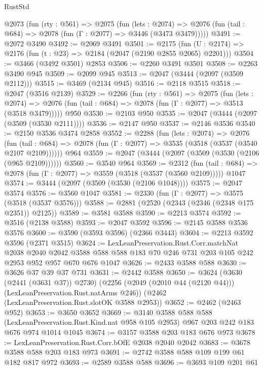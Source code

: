\begin{lexlean}{RustStd}
\begin{coremodule}
  @2073
    (fun (rty : @561) =>
    @2075
      (fun (lets : @2074) =>
      @2076 (fun (tail : @684) => @2078 (fun (Γ : @2077) => @3446 (@3473 @3479)))))
@3491 := @2072 @3490
@3492 := @2069 @3491
@3501 := @2175 (fun (U : @2174) => @2176 (fun (t : @23) => @2184 (@2047 (@2190 @2855 @2065) @2201)))
@3504 := @3466 (@3492 @3501) @2853
@3506 := @2260 @3491 @3501
@3508 := @2263 @3490 @945
@3509 := @2099 @945
@3513 := @2047 (@3444 (@2097 (@3509 @2112)))
@3515 := @3469 (@2134 @945)
@3516 := @2118 @3515
@3518 := @2047 (@3516 @2139)
@3529 := @2266
    (fun (rty : @561) =>
    @2075
      (fun (lets : @2074) =>
      @2076 (fun (tail : @684) => @2078 (fun (Γ : @2077) => @3513 (@3518 @3479)))))
    @950
@3530 := @2103 @950
@3535 := @2047 (@3444 (@2097 (@3509 (@3530 @2111))))
@3536 := @2147 @950
@3537 := @2146 @3536
@3540 := @2150 @3536 @3474 @2858
@3552 := @2288
    (fun (lets : @2074) =>
    @2076
      (fun (tail : @684) => @2078 (fun (Γ : @2077) => @3535 (@3518 (@3537 (@3540 @2107 @2109))))))
    @964
@3559 := @2047 (@3444 (@2097 (@3509 (@3530 (@2106 (@965 @2109))))))
@3560 := @3540 @964
@3569 := @2312
    (fun (tail : @684) => @2078 (fun (Γ : @2077) => @3559 (@3518 (@3537 (@3560 @2109)))))
    @1047
@3574 := @3444 (@2097 (@3509 (@3530 (@2106 @1048))))
@3575 := @2047 @3574
@3576 := @3560 @1047
@3581 := @2330 (fun (Γ : @2077) => @3575 (@3518 (@3537 @3576)))
@3588 := @2881 (@2520 (@2343 (@2346 (@2348 @175 @2351)) @2125))
@3589 := @3581 @3588
@3590 := @2213 @3574
@3592 := @3516 (@2138 @3588)
@3593 := @2047 @3592
@3596 := @2145 @3588 @3536 @3576
@3600 := @3590 (@3593 @3596) (@2366 @3443)
@3604 := @2213 @3592 @3596 (@2371 @3515)
@3624 := LexLeanPreservation.Rust.Corr.matchNat
    @2038
    @2040
    @2042
    @3588
    @588
    @588
    @183
    @70
    @246
    @731
    @203
    @105
    @242
    @2953
    @952
    @957
    @670
    @676
    @1047
@3626 := @2433 @3588 @588
@3630 := @3626 @37 @39 @37 @731
@3631 := @2442 @3588
@3650 := @3624
    (@3630 (@2441 (@3631 @37)) @2730)
    (@2256 (@2049 (@2010 @44 (@2120 @44))) (LexLeanPreservation.Rust.natArms @246))
    (@2462 (LexLeanPreservation.Rust.slotOK @3588 @2953))
@3652 := @2462 (@2463 @952)
@3653 := @3650 @3652
@3669 := @3140
    @3588
    @588
    @588
    (LexLeanPreservation.Rust.Kind.nat @958 @105 @2953)
    @967
    @203
    @242
    @183
    @676
    @974
    @1014
    @1045
@3674 := @3157 @3588 @203 @183 @676 @973
@3678 := LexLeanPreservation.Rust.Corr.bOfE @2038 @2040 @2042
@3683 := @3678 @3588 @588 @203 @183 @973
@3691 := @2742 @3588 @588 @109 @199 @61 @182 @817 @972
@3693 := @2589 @3588 @588
@3696 := @3693 @109 @201 @61

\end{coremodule}
\end{lexlean}
